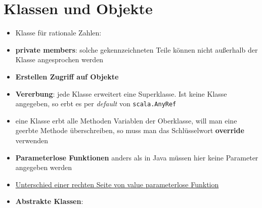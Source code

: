 \section{Klassen und Objekte}
\begin{itemize}
  \item Klasse für rationale Zahlen:
  
  
  
  \item \textbf{private members}: solche gekennzeichneten Teile können nicht
  außerhalb der Klasse angesprochen werden
  \item \textbf{Erstellen \und Zugriff auf Objekte}
  
  
  \item \textbf{Vererbung}: jede Klasse erweitert eine Superklasse. Ist
  keine Klasse angegeben, so erbt es per \textit{default} von
  \texttt{scala.AnyRef}
  
  
  
  \item eine Klasse erbt alle Methoden \und Variablen der Oberklasse, will
  man eine geerbte Methode überschreiben, so muss man das Schlüsselwort
  \textbf{override} verwenden
  
  
  
  \item \textbf{Parameterlose Funktionen} anders als in Java müssen hier keine
  Parameter angegeben werden
  
  
  
  \item \uline{Unterschied einer rechten Seite von value \und parameterlose Funktion}
  \item \textbf{Abstrakte Klassen}: 
  

\end{itemize}
